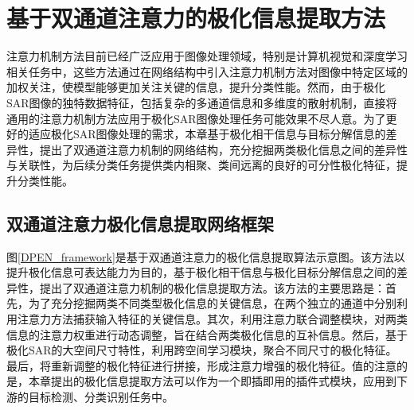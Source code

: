 \section{基于双通道注意力的极化信息提取方法}

注意力机制方法目前已经广泛应用于图像处理领域，特别是计算机视觉和深度学习相关任务中，这些方法通过在网络结构中引入注意力机制方法对图像中特定区域的加权关注，使模型能够更加关注关键的信息，提升分类性能。然而，由于极化SAR图像的独特数据特征，包括复杂的多通道信息和多维度的散射机制，直接将通用的注意力机制方法应用于极化SAR图像处理任务可能效果不尽人意。为了更好的适应极化SAR图像处理的需求，本章基于极化相干信息与目标分解信息的差异性，提出了双通道注意力机制的网络结构，充分挖掘两类极化信息之间的差异性与关联性，为后续分类任务提供类内相聚、类间远离的良好的可分性极化特征，提升分类性能。


\subsection{双通道注意力极化信息提取网络框架}

图\ref{DPEN_framework}是基于双通道注意力的极化信息提取算法示意图。该方法以提升极化信息可表达能力为目的，基于极化相干信息与极化目标分解信息之间的差异性，提出了双通道注意力机制的极化信息提取方法。该方法的主要思路是：首先，为了充分挖掘两类不同类型极化信息的关键信息，在两个独立的通道中分别利用注意力方法捕获输入特征的关键信息。其次，利用注意力联合调整模块，对两类信息的注意力权重进行动态调整，旨在结合两类极化信息的互补信息。然后，基于极化SAR的大空间尺寸特性，利用跨空间学习模块，聚合不同尺寸的极化特征。最后，将重新调整的极化特征进行拼接，形成注意力增强的极化特征。值的注意的是，本章提出的极化信息提取方法可以作为一个即插即用的插件式模块，应用到下游的目标检测、分类识别任务中。

